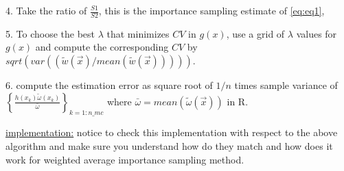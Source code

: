 \documentclass[12pt]{article}
\newcommand{\set}[1]{\left\{#1\right\}}
\numberwithin{equation}{subsection}
\begin{document}
4. Take the ratio of $\frac{S1}{S2}$, this is the importance sampling estimate of \eqref{eq:eq1},

5. To choose the best $\lambda$ that minimizes $CV$ in $g(x)$, use a grid of $\lambda$ values for $g(x)$ and compute the corresponding $CV$ by $sqrt( var( (\tilde{w}(\vec{x})/mean(\tilde{w}(\vec{x})))))$.

6. compute the estimation error as square root of $1/n$ times sample variance of $\set{\frac{h(x_k)\tilde{\omega}(x_k)}{\bar{\omega}}}_{k=1 : n\_mc}$ where $\bar{\omega} = mean(\tilde{\omega}(\vec{x}))$ in R. \newline

\underline{implementation:} notice to check this implementation with respect to the above algorithm and make sure you understand how do they match and how does it work for weighted average importance sampling method.
\end{document}
